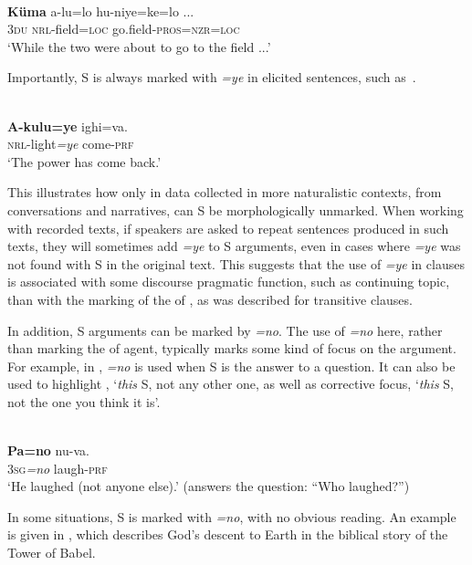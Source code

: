 \documentclass[output=paper]{LSP/langsci}
\begin{document}
\ea\label{13-te-ex:22}
\\
\gll \textbf{Küma} a-lu=lo hu-niye=ke=lo {...}\\
3\textsc{du} \textsc{nrl}-field=\textsc{loc} go.field-\textsc{pros}=\textsc{nzr}=\textsc{loc}\\
\glt ‘While the two were about to go to the field ...’  %
\z

Importantly, S is always marked with \textit{=ye} in elicited sentences, such as~.

\ea\label{13-te-ex:23}
\\
\gll \textbf{A-kulu=ye} ighi=va.\\
\textsc{nrl-}light\textit{=ye} come-\textsc{prf}\\
\glt ‘The power has come back.’ %
\z

This illustrates how only in data collected in more naturalistic contexts, \ie from conversations and narratives, can S be morphologically unmarked. When working with recorded texts, if speakers are asked to repeat sentences produced in such texts, they will sometimes add \textit{=ye} to S arguments, even in cases where \textit{=ye} was not found with S in the original text. This suggests that the use of \textit{=ye} in  clauses is associated with some discourse pragmatic function, such as continuing topic, than with the marking of the  of , as was described for transitive clauses.

In addition, S arguments can be marked by \textit{=no}. The use of \textit{=no} here, rather than marking the  of agent, typically marks some kind of focus on the argument. For example, in , \textit{=no} is used when S is the answer to a question. It can also be used to highlight , \ie ‘\textit{this} S, not any other one, as well as corrective focus, \ie ‘\textit{this} S, not the one you think it is’.

\ea\label{13-te-ex:24}
\\
\gll \textbf{Pa=no} nu-va.\\
3\textsc{sg}\textit{=no} laugh-\textsc{prf}\\
\glt ‘He laughed (not anyone else).’ (answers the question: “Who laughed?”) %
\z

In some situations, S is marked with \textit{=no}, with no obvious  reading. An example is given in , which describes God’s descent to Earth in the biblical story of the Tower of Babel. 
\end{document}
